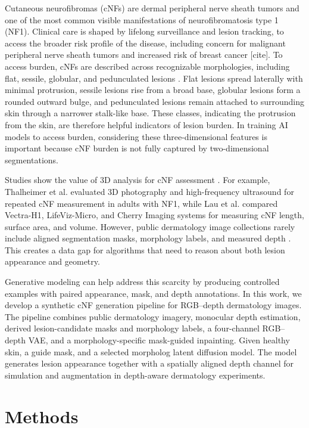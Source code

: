 \documentclass[runningheads]{llncs}
\begin{document}
Cutaneous neurofibromas (cNFs) are dermal peripheral nerve sheath tumors and one of the most common visible manifestations of neurofibromatosis type 1 (NF1). Clinical care is shaped by lifelong surveillance and lesion tracking, to access the broader risk profile of the disease, including concern for malignant peripheral nerve sheath tumors \cite{li2023current} and increased risk of breast cancer [cite]. To access burden, cNFs are described across recognizable morphologies, including flat, sessile, globular, and pedunculated lesions \cite{ortonne2018cutaneous,li2023current}. Flat lesions spread laterally with minimal protrusion, sessile lesions rise from a broad base, globular lesions form a rounded outward bulge, and pedunculated lesions remain attached to surrounding skin through a narrower stalk-like base. These classes, indicating the protrusion from the skin, are therefore helpful indicators of lesion burden. In training AI models to access burden, considering these three-dimensional features is important because cNF burden is not fully captured by two-dimensional segmentations.

Studies show the value of 3D analysis for cNF assessment \cite{thalheimer2021validating,berman2024comparing}. For example, Thalheimer et al. evaluated 3D photography and high-frequency ultrasound for repeated cNF measurement in adults with NF1, while Lau et al. compared Vectra-H1, LifeViz-Micro, and Cherry Imaging systems for measuring cNF length, surface area, and volume. However, public dermatology image collections rarely include aligned segmentation masks, morphology labels, and measured depth \cite{groh2021fitzpatrick}. This creates a data gap for algorithms that need to reason about both lesion appearance and geometry.

Generative modeling can help address this scarcity by producing controlled examples with paired appearance, mask, and depth annotations. In this work, we develop a synthetic cNF generation pipeline for RGB--depth dermatology images. The pipeline combines public dermatology imagery, monocular depth estimation, derived lesion-candidate masks and morphology labels, a four-channel RGB--depth VAE, and a morphology-specific mask-guided inpainting. Given healthy skin, a guide mask, and a selected morpholog latent diffusion model. The model generates lesion appearance together with a spatially aligned depth channel for simulation and augmentation in depth-aware dermatology experiments.

\section{Methods}
\end{document}
